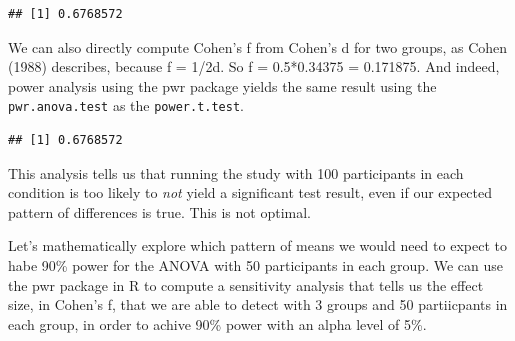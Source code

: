 \documentclass[]{book}
\newenvironment{Shaded}{\begin{snugshade}}{\end{snugshade}}
\newcommand{\DataTypeTok}[1]{\textcolor[rgb]{0.13,0.29,0.53}{#1}}
\newcommand{\DecValTok}[1]{\textcolor[rgb]{0.00,0.00,0.81}{#1}}
\newcommand{\FloatTok}[1]{\textcolor[rgb]{0.00,0.00,0.81}{#1}}
\newcommand{\KeywordTok}[1]{\textcolor[rgb]{0.13,0.29,0.53}{\textbf{#1}}}
\newcommand{\NormalTok}[1]{#1}
\newcommand{\OperatorTok}[1]{\textcolor[rgb]{0.81,0.36,0.00}{\textbf{#1}}}
\newcommand{\StringTok}[1]{\textcolor[rgb]{0.31,0.60,0.02}{#1}}
\begin{document}
\begin{Shaded}
\end{Shaded}

\begin{verbatim}
## [1] 0.6768572
\end{verbatim}

We can also directly compute Cohen's f from Cohen's d for two groups, as Cohen (1988) describes, because f = 1/2d. So f = 0.5*0.34375 = 0.171875. And indeed, power analysis using the pwr package yields the same result using the \texttt{pwr.anova.test} as the \texttt{power.t.test}.

\begin{Shaded}
\end{Shaded}

\begin{verbatim}
## [1] 0.6768572
\end{verbatim}

This analysis tells us that running the study with 100 participants in each condition is too likely to \emph{not} yield a significant test result, even if our expected pattern of differences is true. This is not optimal.

Let's mathematically explore which pattern of means we would need to expect to habe 90\% power for the ANOVA with 50 participants in each group. We can use the pwr package in R to compute a sensitivity analysis that tells us the effect size, in Cohen's f, that we are able to detect with 3 groups and 50 partiicpants in each group, in order to achive 90\% power with an alpha level of 5\%.
\end{document}
